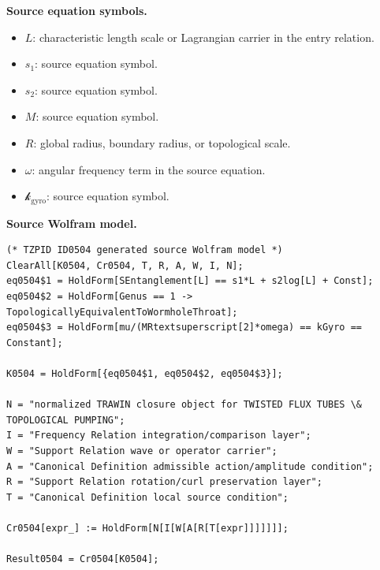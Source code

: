 \begin{minipage}[t]{0.49\linewidth}
\begingroup
\small
\raggedright
\textbf{Source equation symbols.}\par
\begin{itemize}[leftmargin=1.35em,itemsep=1pt,topsep=1pt,parsep=0pt]
    \item $L$: characteristic length scale or Lagrangian carrier in the entry relation.
    \item $s_1$: source equation symbol.
    \item $s_2$: source equation symbol.
    \item $M$: source equation symbol.
    \item $R$: global radius, boundary radius, or topological scale.
    \item $\omega$: angular frequency term in the source equation.
    \item $\mathcal{k}_{\mathrm{gyro}}$: source equation symbol.
\end{itemize}
\endgroup
\end{minipage}\hfill
\begin{minipage}[t]{0.47\linewidth}
\begingroup
\scriptsize
\raggedright
\textbf{Source Wolfram model.}\par
\begin{Verbatim}[fontsize=\tiny,breaklines=true,breakanywhere=true]
(* TZPID ID0504 generated source Wolfram model *)
ClearAll[K0504, Cr0504, T, R, A, W, I, N];
eq0504$1 = HoldForm[SEntanglement[L] == s1*L + s2log[L] + Const];
eq0504$2 = HoldForm[Genus == 1 -> TopologicallyEquivalentToWormholeThroat];
eq0504$3 = HoldForm[mu/(MRtextsuperscript[2]*omega) == kGyro == Constant];

K0504 = HoldForm[{eq0504$1, eq0504$2, eq0504$3}];

N = "normalized TRAWIN closure object for TWISTED FLUX TUBES \& TOPOLOGICAL PUMPING";
I = "Frequency Relation integration/comparison layer";
W = "Support Relation wave or operator carrier";
A = "Canonical Definition admissible action/amplitude condition";
R = "Support Relation rotation/curl preservation layer";
T = "Canonical Definition local source condition";

Cr0504[expr_] := HoldForm[N[I[W[A[R[T[expr]]]]]]];

Result0504 = Cr0504[K0504];
\end{Verbatim}
\endgroup
\end{minipage}


